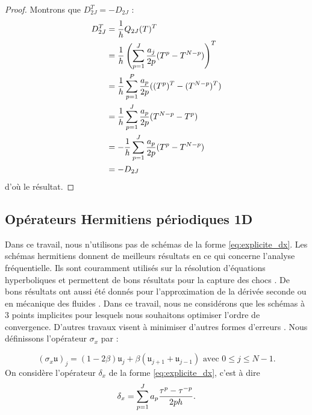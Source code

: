 \begin{proof}
Montrons que $D_{2J}^T = - D_{2J}$ :
\begin{align*}
D_{2J}^T & = \dfrac{1}{h} Q_{2J}(T)^T \\
	& = \dfrac{1}{h} \left( \displaystyle\sum\limits_{p=1}^J \dfrac{a_j}{2p} (T^p - T^{N-p}) \right)^T\\
	& = \dfrac{1}{h}\displaystyle\sum\limits_{p=1}^P \dfrac{a_p}{2p} ((T^p)^T - (T^{N-p})^T) \\
	& = \dfrac{1}{h}\displaystyle\sum\limits_{p=1}^J \dfrac{a_p}{2p} (T^{N-p} - T^{p}) \\
	& = - \dfrac{1}{h} \displaystyle\sum\limits_{p=1}^J \dfrac{a_p}{2p} (T^p - T^{N-p}) \\
	& = - D_{2J}
\end{align*}
d'où le résultat.
\end{proof}




























\subsection{Opérateurs Hermitiens périodiques 1D}

Dans ce travail, nous n'utilisons pas de schémas de la forme \eqref{eq:explicite_dx}. Les schémas hermitiens \cite{Lele1991} donnent de meilleurs résultats en ce qui concerne l'analyse fréquentielle. Ils sont couramment utilisés sur la résolution d'équations hyperboliques \cite{Chu1998} et permettent de bons résultats pour la capture des chocs \cite{Jiang2001}. De bons résultats ont aussi été donnés pour l'approximation de la dérivée seconde \cite{Abbas2011, Keller1971} ou en mécanique des fluides \cite{BenArtzi2005, BenArtzi2013}. Dans ce travail, nous ne considérons que les schémas à 3 points implicites pour lesquels nous souhaitons optimiser l'ordre de convergence. D'autres travaux visent à minimiser d'autres formes d'erreurs \cite{Kim1996, Kim2007}. Nous définissons l'opérateur $\sigma_{x}$ par :

\begin{equation}
(\sigma_{x} \mathfrak{u})_j = (1-2\beta) \mathfrak{u}_j + \beta \left( \mathfrak{u}_{j+1} + \mathfrak{u}_{j-1} \right) \text{ avec } 0 \leq j \leq N-1.
\end{equation}
On considère l'opérateur $\delta_x$ de la forme \eqref{eq:explicite_dx}, c'est à dire
\begin{equation}
\delta_x = \displaystyle\sum\limits_{p=1}^J a_p \dfrac{\tau^p - \tau^{-p}}{2ph}.
\end{equation}

